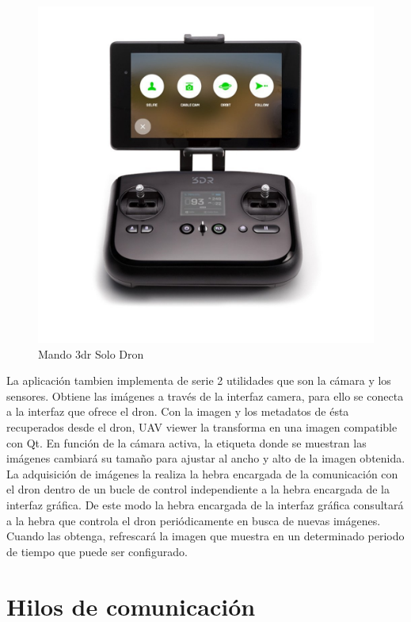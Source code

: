 \begin{figure}[H]
  \centering
  \includegraphics[scale=0.3]{imagenes/mando.jpg}
  \caption{Mando 3dr Solo Dron}
  \label{fig:mando}
\end{figure}

La aplicación tambien implementa de serie 2 utilidades que son la cámara y los sensores. Obtiene las imágenes a través de la interfaz camera, para ello se conecta a la interfaz que ofrece el dron. Con la imagen y los metadatos de ésta recuperados desde el dron,
UAV viewer la transforma en una imagen compatible con Qt. En función de la cámara activa, la etiqueta donde se muestran las imágenes cambiará su tamaño para ajustar al ancho y alto de la imagen obtenida. La adquisición de imágenes la realiza la hebra encargada de la comunicación con el dron dentro de un bucle de control independiente a la hebra encargada de la interfaz gráfica. De este modo la hebra encargada de la interfaz gráfica consultará a la hebra que controla el dron periódicamente en busca de nuevas imágenes. Cuando las obtenga, refrescará la imagen que muestra en un determinado periodo de tiempo que puede ser configurado.

\section{Hilos de comunicación} 

